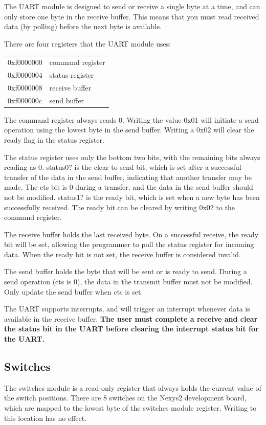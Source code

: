 \documentclass{article}
\begin{document}
The UART module is designed to send or receive a single byte at a time, and can only store one byte in the receive buffer. This means that you must read received data (by polling) before the next byte is available.

There are four registers that the UART module uses: 
\begin{tabular}{ | l | l | }
\hline
0xf0000000 & command register \\
0xf0000004 & status register \\
0xf0000008 & receive buffer \\
0xf000000c & send buffer \\
\hline
\end{tabular}
The command register always reads 0. Writing the value 0x01 will initiate a send operation using the lowest byte in the send buffer. Writing a 0x02 will clear the ready flag in the status register.

The status register uses only the bottom two bits, with the remaining bits always reading as 0. status0? is the clear to send bit, which is set after a successful transfer of the data in the send buffer, indicating that another transfer may be made. The cts bit is 0 during a transfer, and the data in the send buffer should not be modified. status1? is the ready bit, which is set when a new byte has been successfully received. The ready bit can be cleared by writing 0x02 to the command register.

The receive buffer holds the last received byte. On a successful receive, the ready bit will be set, allowing the programmer to poll the status register for incoming data. When the ready bit is not set, the receive buffer is considered invalid.

The send buffer holds the byte that will be sent or is ready to send. During a send operation (cts is 0), the data in the transmit buffer must not be modified. Only update the send buffer when cts is set.

The UART supports interrupts, and will trigger an interrupt whenever data is available in the receive buffer. \textbf{The user must complete a receive and clear the status bit in the UART before clearing the interrupt status bit for the UART.}
\subsection{Switches}
The switches module is a read-only register that always holds the current value of the switch positions. There are 8 switches on the Nexys2 development board, which are mapped to the lowest byte of the switches module register. Writing to this location has no effect. 
\end{document}
